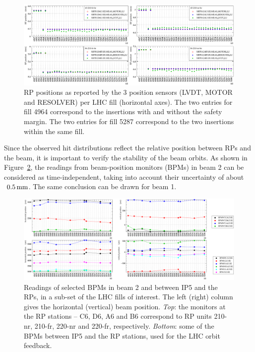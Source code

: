 \documentclass[TOTEM]{cern/cernphprep}
\def\un#1{\,{\rm #1}}
\begin{document}
\begin{figure}[h!]
\begin{center}
\includegraphics[width=1\hsize]{fig/conditions/rp_positions_rps.pdf}
\caption{%
RP positions as reported by the 3 position sensors (LVDT, MOTOR and RESOLVER) per LHC fill (horizontal axes). The two entries for fill 4964 correspond to the insertions with and without the safety margin. The two entries for fill 5287 correspond to the two insertions within the same fill.
}
\label{fig:cond_rp}
\end{center}
\end{figure}


Since the observed hit distributions reflect the relative position between RPs and the beam, it is important to verify the stability of the beam orbits. As shown in Figure~\ref{fig:cond_bpm}, the readings from beam-position monitors (BPMs) in beam 2 can be considered as time-independent, taking into account their uncertainty of about $~0.5\un{mm}$. The same conclusion can be drawn for beam 1.

\begin{figure}[h!]
\begin{center}
\includegraphics[width=1\hsize]{fig/conditions/bpm_comparison.pdf}
\caption{%
Readings of selected BPMs in beam 2 and between IP5 and the RPs, in a sub-set of the LHC fills of interest. The left (right) column gives the horizontal (vertical) beam position.
{\it Top}: the monitors at the RP stations -- C6, D6, A6 and B6 correspond to RP units 210-nr, 210-fr, 220-nr and 220-fr, respectively.
{\it Bottom}: some of the BPMs between IP5 and the RP stations, used for the LHC orbit feedback.
}
\label{fig:cond_bpm}
\end{center}
\end{figure}
\end{document}
